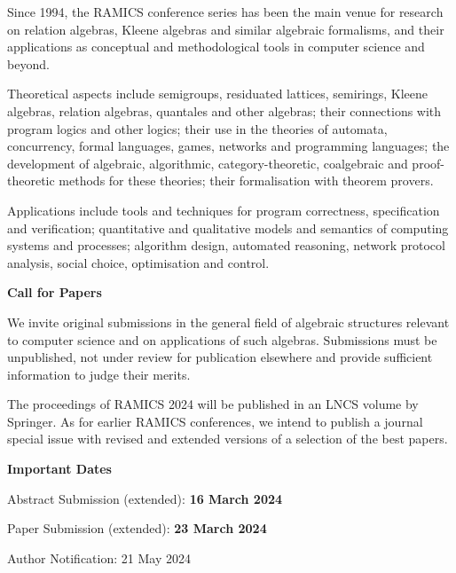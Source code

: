\documentclass[a3paper, 12pt]{article}
\newcommand*\nfont{\fontsize{16}{19}\selectfont}
\begin{document}
\begin{minipage}[t]{.473\linewidth}
  \nfont%
  Since 1994, the RAMICS conference series has been the main venue for
  research on relation algebras, Kleene algebras and similar algebraic
  formalisms, and their applications as conceptual and methodological
  tools in computer science and beyond.

  \medskip

  Theoretical aspects include semigroups, residuated lattices,
  semirings, Kleene algebras, relation algebras, quantales and other
  algebras; their connections with program logics and other logics;
  their use in the theories of automata, concurrency, formal
  languages, games, networks and programming languages; the
  development of algebraic, algorithmic, category-theoretic,
  coalgebraic and proof-theoretic methods for these theories; their
  formalisation with theorem provers.

  \medskip

  Applications include tools and techniques for program correctness,
  specification and verification; quantitative and qualitative models
  and semantics of computing systems and processes; algorithm design,
  automated reasoning, network protocol analysis, social choice,
  optimisation and control.

  \bigskip

  {\Large \bf Call for Papers}

  \smallskip

  We invite original submissions in the general field of algebraic
  structures relevant to computer science and on applications of such
  algebras.  Submissions must be unpublished, not under review for
  publication elsewhere and provide sufficient information to judge
  their merits.

  The proceedings of RAMICS 2024 will be published in an LNCS volume
  by Springer.  As for earlier RAMICS conferences, we intend to
  publish a journal special issue with revised and extended versions
  of a selection of the best papers.
  
  \bigskip
  
  {\Large \bf Important Dates}

  \smallskip

  Abstract Submission (extended): \textbf{16 March 2024}
  
  Paper Submission (extended): \textbf{23 March 2024}
  
  Author Notification: 21 May 2024

\end{minipage}
\end{document}
